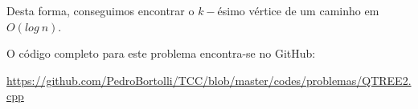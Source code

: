 Desta forma, conseguimos encontrar o $k-$ésimo vértice de um caminho em $O(log\ n)$.

\vspace{0.5cm}

O código completo para este problema encontra-se no GitHub:

\url{https://github.com/PedroBortolli/TCC/blob/master/codes/problemas/QTREE2.cpp}

\vspace{0.3cm}

